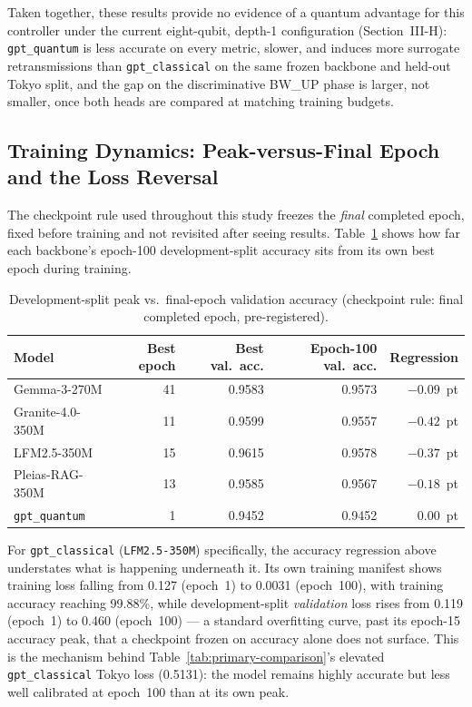Taken together, these results provide no evidence of a quantum advantage for this controller under the current eight-qubit, depth-1 configuration (Section~III-H): \texttt{gpt\_quantum} is less accurate on every metric, slower, and induces more surrogate retransmissions than \texttt{gpt\_classical} on the same frozen backbone and held-out Tokyo split, and the gap on the discriminative BW\_UP phase is larger, not smaller, once both heads are compared at matching training budgets.

\subsection{Training Dynamics: Peak-versus-Final Epoch and the Loss Reversal}

The checkpoint rule used throughout this study freezes the \emph{final} completed epoch, fixed before training and not revisited after seeing results. Table~\ref{tab:peak-vs-final} shows how far each backbone's epoch-100 development-split accuracy sits from its own best epoch during training.

\begin{table}[!t]
\caption{Development-split peak vs.\ final-epoch validation accuracy (checkpoint rule: final completed epoch, pre-registered).}
\label{tab:peak-vs-final}
\centering
\begin{tabular}{lrrrr}
\hline
Model & Best epoch & Best val.\ acc. & Epoch-100 val.\ acc. & Regression \\
\hline
Gemma-3-270M      & 41 & 0.9583 & 0.9573 & $-0.09$~pt \\
Granite-4.0-350M  & 11 & 0.9599 & 0.9557 & $-0.42$~pt \\
LFM2.5-350M       & 15 & 0.9615 & 0.9578 & $-0.37$~pt \\
Pleias-RAG-350M   & 13 & 0.9585 & 0.9567 & $-0.18$~pt \\
\texttt{gpt\_quantum} & 1 & 0.9452 & 0.9452 & $0.00$~pt \\
\hline
\end{tabular}
\end{table}

For \texttt{gpt\_classical} (\texttt{LFM2.5-350M}) specifically, the accuracy regression above understates what is happening underneath it. Its own training manifest shows training loss falling from 0.127 (epoch~1) to 0.0031 (epoch~100), with training accuracy reaching 99.88\%, while development-split \emph{validation} loss rises from 0.119 (epoch~1) to 0.460 (epoch~100) --- a standard overfitting curve, past its epoch-15 accuracy peak, that a checkpoint frozen on accuracy alone does not surface. This is the mechanism behind Table~\ref{tab:primary-comparison}'s elevated \texttt{gpt\_classical} Tokyo loss (0.5131): the model remains highly accurate but less well calibrated at epoch~100 than at its own peak.

